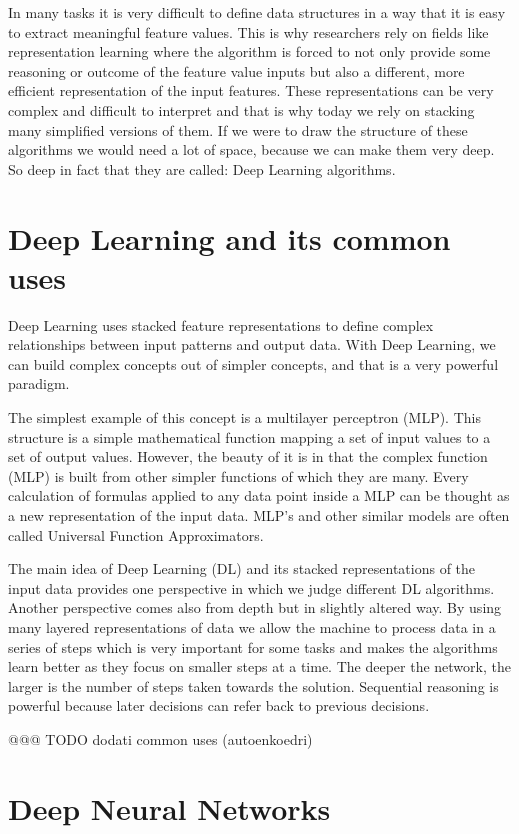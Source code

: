 \documentclass[b5paper]{book}
\begin{document}
In many tasks it is very difficult to define data structures in a way that it is easy to extract meaningful feature values. This is why researchers rely on fields like representation learning where the algorithm is forced to not only provide some reasoning or outcome of the feature value inputs but also a different, more efficient representation of the input features. These representations can be very complex and difficult to interpret and that is why today we rely on stacking many simplified versions of them. If we were to draw the structure of these algorithms we would need a lot of space, because we can make them very deep. So deep in fact that they are called: Deep Learning algorithms.

\section{Deep Learning and its common uses}

Deep Learning uses stacked feature representations to define complex relationships between input patterns and output data. With Deep Learning, we can build complex concepts out of simpler concepts, and that is a very powerful paradigm. 

The simplest example of this concept is a multilayer perceptron (MLP). This structure is a simple mathematical function mapping a set of input values to a set of output values. However, the beauty of it is in that the complex function (MLP) is built from other simpler functions of which they are many. Every calculation of formulas applied to any data point inside a MLP can be thought as a new representation of the input data. MLP's and other similar models are often called Universal Function Approximators. 

The main idea of Deep Learning (DL) and its stacked representations of the input data provides one perspective in which we judge different DL algorithms. Another perspective comes also from depth but in slightly altered way. By using many layered representations of data we allow the machine to process data in a series of steps which is very important for some tasks and makes the algorithms learn better as they focus on smaller steps at a time. The deeper the network, the larger is the number of steps taken towards the solution. Sequential reasoning is powerful because later decisions can refer back to previous decisions. 

@@@ TODO dodati common uses (autoenkoedri)

\section{Deep Neural Networks}
\end{document}
